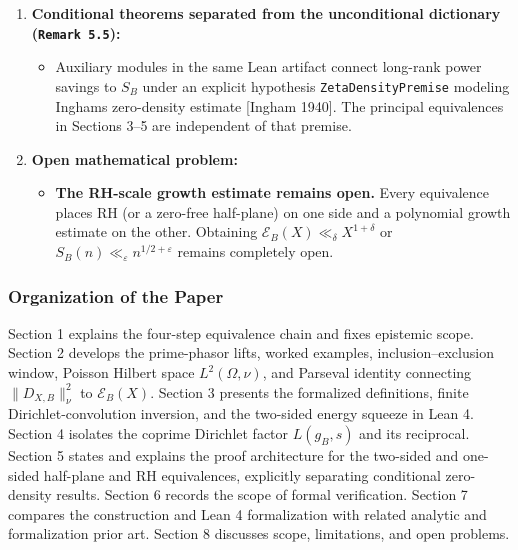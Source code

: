 \documentclass[11pt]{article}
\providecommand{\tightlist}{\setlength{\itemsep}{0pt}\setlength{\parskip}{0pt}}
\begin{document}
\begin{enumerate}
  \begin{itemize}
  \tightlist
  \item
    The Hilbert-space observation that \(\overline{z_p} - p^{-1}\) has squared norm \(1 - p^{-2} > 0\) while being orthogonal to all \(Z(n)\) (showing the closed span of \(\{\Psi_r\}\) is strictly smaller than \(L^2(\Omega, \nu)\)) is given analytically in prose; and Proposition 2.5 is independently corroborated at \(B = 91\) by \texttt{9,291} exact rational-arithmetic checks across \texttt{578} configurations up to \(X = 1000\).
  \end{itemize}
\item
  \textbf{Conditional theorems separated from the unconditional dictionary (\texttt{Remark\ 5.5}):}

  \begin{itemize}
  \tightlist
  \item
    Auxiliary modules in the same Lean artifact connect long-rank power savings to \(S_B\) under an explicit hypothesis \texttt{ZetaDensityPremise} modeling Ingham\textquotesingle s zero-density estimate {[}Ingham 1940{]}. The principal equivalences in Sections 3--5 are independent of that premise.
  \end{itemize}
\item
  \textbf{Open mathematical problem:}

  \begin{itemize}
  \tightlist
  \item
    \textbf{The RH-scale growth estimate remains open.} Every equivalence places \(\mathrm{RH}\) (or a zero-free half-plane) on one side and a polynomial growth estimate on the other. Obtaining \(\mathscr{E}_B(X) \ll_\delta X^{1+\delta}\) or \(S_B(n) \ll_\varepsilon n^{1/2+\varepsilon}\) remains completely open.
  \end{itemize}
\end{enumerate}

\subsubsection{Organization of the Paper}\label{organization-of-the-paper}

Section 1 explains the four-step equivalence chain and fixes epistemic scope. Section 2 develops the prime-phasor lifts, worked examples, inclusion--exclusion window, Poisson Hilbert space \(L^2(\Omega, \nu)\), and Parseval identity connecting \(\|D_{X,B}\|_\nu^2\) to \(\mathscr{E}_B(X)\). Section 3 presents the formalized definitions, finite Dirichlet-convolution inversion, and the two-sided energy squeeze in Lean 4. Section 4 isolates the coprime Dirichlet factor \(L(g_B, s)\) and its reciprocal. Section 5 states and explains the proof architecture for the two-sided and one-sided half-plane and RH equivalences, explicitly separating conditional zero-density results. Section 6 records the scope of formal verification. Section 7 compares the construction and Lean 4 formalization with related analytic and formalization prior art. Section 8 discusses scope, limitations, and open problems.
\end{document}
